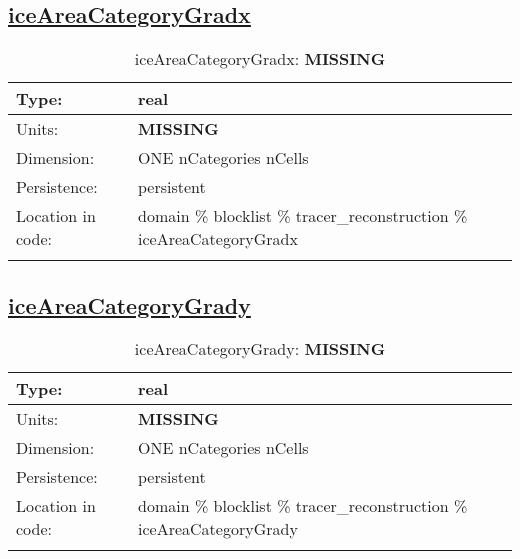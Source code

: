 \subsection[iceAreaCategoryGradx]{\hyperref[sec:var_tab_tracer_reconstruction]{iceAreaCategoryGradx}}
\label{subsec:var_sec_tracer_reconstruction_iceAreaCategoryGradx}
\begin{center}
\begin{longtable}{| p{2.0in} | p{4.0in} |}
        \hline 
        Type: & real \\
        \hline 
        Units: & {\bf \color{red} MISSING} \\
        \hline 
        Dimension: & ONE nCategories nCells \\
        \hline 
        Persistence: & persistent \\
        \hline 
         Location in code: & domain \% blocklist \% tracer\_reconstruction \% iceAreaCategoryGradx \\
         \hline 
    \caption{iceAreaCategoryGradx: {\bf \color{red} MISSING}}
\end{longtable}
\end{center}
\subsection[iceAreaCategoryGrady]{\hyperref[sec:var_tab_tracer_reconstruction]{iceAreaCategoryGrady}}
\label{subsec:var_sec_tracer_reconstruction_iceAreaCategoryGrady}
\begin{center}
\begin{longtable}{| p{2.0in} | p{4.0in} |}
        \hline 
        Type: & real \\
        \hline 
        Units: & {\bf \color{red} MISSING} \\
        \hline 
        Dimension: & ONE nCategories nCells \\
        \hline 
        Persistence: & persistent \\
        \hline 
         Location in code: & domain \% blocklist \% tracer\_reconstruction \% iceAreaCategoryGrady \\
         \hline 
    \caption{iceAreaCategoryGrady: {\bf \color{red} MISSING}}
\end{longtable}
\end{center}
